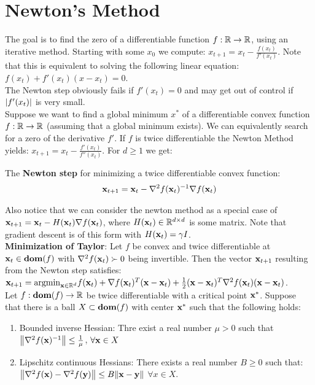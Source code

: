 \section{Newton’s Method}
The goal is to find the zero of a differentiable function $f : \mathbb{R} \rightarrow \mathbb{R}$, using an iterative method. Starting with some $x_0$ we compute: $x_{t+1} = x_t - \frac{f(x_t)}{f'(x_t)}$. Note that this is equivalent to solving the following linear equation: $f(x_t) + f'(x_t)(x - x_t) = 0$. \\
The Newton step obviously fails if $f'(x_t) = 0$ and may get out of control if $\abs{f'(x_t)}$ is very small. \\
Suppose we want to find a global minimum $x^*$ of a differentiable convex function $f: \mathbb{R} \rightarrow \mathbb{R}$ (assuming that a global minimum exists). We can equivalently search for a zero of the derivative $f'$. If $f$ is twice differentiable the Newton Method yields: $x_{t+1} = x_t - \frac{f'(x_t)}{f''(x_t)}$. For $d \geq 1$ we get: 
\begin{framed}
    The \textbf{Newton step} for minimizing a twice differentiable convex function:
    \begin{align*}
        \mathbf{x}_{t+1} = \mathbf{x}_t - \nabla^2 f(\mathbf{x}_t)^{-1} \nabla f(\mathbf{x}_t)
    \end{align*}
\end{framed}
Also notice that we can consider the newton method as a special case of $\mathbf{x}_{t+1} = \mathbf{x}_t - H(\mathbf{x}_t) \nabla f(\mathbf{x}_t)$, where $H(\mathbf{x}_t) \in \mathbb{R}^{d \times d}$ is some matrix. Note that gradient descent is of this form with $H(\mathbf{x}_t) = \gamma I$. \\
\textbf{Minimization of Taylor}: Let $f$ be convex and twice differentiable at $\mathbf{x}_t \in \textbf{dom}(f)$ with $\nabla^2 f(\mathbf{x}_t) \succ 0$ being invertible. Then the vector $\mathbf{x}_{t+1}$ resulting from the Newton step satisfies: $\mathbf{x}_{t+1} = \mathrm{argmin}_{\mathbf{x} \in \mathbb{R}^d}{f(\mathbf{x}_t) + \nabla f(\mathbf{x}_t)^T(\mathbf{x} - \mathbf{x}_t) + \frac{1}{2}(\mathbf{x} - \mathbf{x}_t)^T \nabla^2 f(\mathbf{x}_t) (\mathbf{x} - \mathbf{x}_t)}$. \\
Let $f : \textbf{dom}(f) \rightarrow \mathbb{R}$ be twice differentiable with a critical point $\mathbf{x}^*$. Suppose that there is a ball $X \subset \textbf{dom}(f)$ with center $\mathbf{x}^*$ such that the following holds:
\begin{enumerate}[label=(\roman*), topsep=0pt,itemsep=0ex,partopsep=0ex,parsep=0ex]  
    \itemsep0em
    \item Bounded inverse Hessian: Thre exist a real number $\mu > 0$ such that $\norm{\nabla^2 f(\mathbf{x})^{-1}} \leq \frac{1}{\mu}$, $\forall \mathbf{x} \in X$
    \item Lipschitz continuous Hessians: There exists a real number $B \geq 0$ such that: $\norm{\nabla^2 f(\mathbf{x}) - \nabla^2 f(\mathbf{y})} \leq B \norm{\mathbf{x} - \mathbf{y}}$ $\forall x \in X$.
\end{enumerate}
